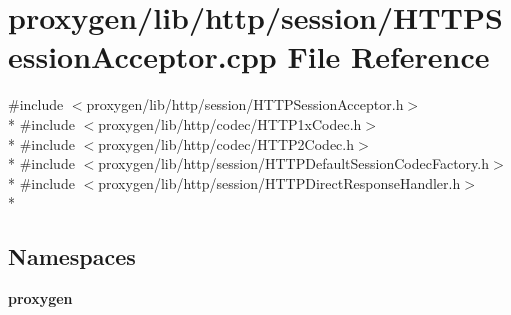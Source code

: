 \section{proxygen/lib/http/session/\+H\+T\+T\+P\+Session\+Acceptor.cpp File Reference}
\label{HTTPSessionAcceptor_8cpp}
{\ttfamily \#include $<$proxygen/lib/http/session/\+H\+T\+T\+P\+Session\+Acceptor.\+h$>$}\\*
{\ttfamily \#include $<$proxygen/lib/http/codec/\+H\+T\+T\+P1x\+Codec.\+h$>$}\\*
{\ttfamily \#include $<$proxygen/lib/http/codec/\+H\+T\+T\+P2\+Codec.\+h$>$}\\*
{\ttfamily \#include $<$proxygen/lib/http/session/\+H\+T\+T\+P\+Default\+Session\+Codec\+Factory.\+h$>$}\\*
{\ttfamily \#include $<$proxygen/lib/http/session/\+H\+T\+T\+P\+Direct\+Response\+Handler.\+h$>$}\\*
\subsection*{Namespaces}
\begin{DoxyCompactItemize}
\item 
 {\bf proxygen}
\end{DoxyCompactItemize}
